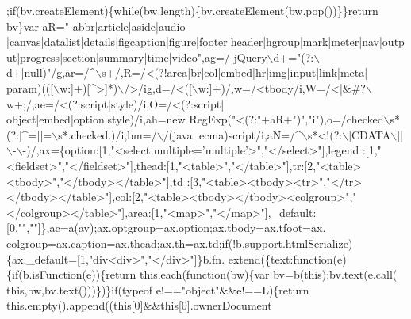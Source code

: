 \begin{DoxyCode}
      ;\textcolor{keywordflow}{if}(bv.createElement)\{\textcolor{keywordflow}{while}(bw.length)\{bv.createElement(bw.pop())\}\}\textcolor{keywordflow}{return} bv\}var aR=\textcolor{stringliteral}{"
      abbr|article|aside|audio
      |canvas|datalist|details|figcaption|figure|footer|header|hgroup|mark|meter|nav|output|progress|section|summary|time|video"},ag=/ jQuery\(\backslash\)d+=\textcolor{stringliteral}{"(?:\(\backslash\)d+|null)"}/g,ar=/^\(\backslash\)s+/,R=/<(?!area|br|col|embed|hr|img|input|link|meta|
      param)(([\(\backslash\)w:]+)[^>]*)\(\backslash\)/>/ig,d=/<([\(\backslash\)w:]+)/,w=/<tbody/i,W=/<|&#?\(\backslash\)w+;/,ae=/<(?:script|style)/i,O=/<(?:script|\textcolor{keywordtype}{
      object}|embed|option|style)/i,ah=\textcolor{keyword}{new} RegExp(\textcolor{stringliteral}{"<(?:"}+aR+\textcolor{stringliteral}{")"},\textcolor{stringliteral}{"i"}),o=/checked\(\backslash\)s*(?:[^=]|=\(\backslash\)s*.checked.)/i,bm=/\(\backslash\)/(java|
      ecma)script/i,aN=/^\(\backslash\)s*<!(?:\(\backslash\)[CDATA\(\backslash\)[|\(\backslash\)-\(\backslash\)-)/,ax=\{option:[1,\textcolor{stringliteral}{"<select multiple='multiple'>"},\textcolor{stringliteral}{"</select>"}],legend
      :[1,\textcolor{stringliteral}{"<fieldset>"},\textcolor{stringliteral}{"</fieldset>"}],thead:[1,\textcolor{stringliteral}{"<table>"},\textcolor{stringliteral}{"</table>"}],tr:[2,\textcolor{stringliteral}{"<table><tbody>"},\textcolor{stringliteral}{"</tbody></table>"}],td
      :[3,\textcolor{stringliteral}{"<table><tbody><tr>"},\textcolor{stringliteral}{"</tr></tbody></table>"}],col:[2,\textcolor{stringliteral}{"<table><tbody></tbody><colgroup>"},\textcolor{stringliteral}{"
      </colgroup></table>"}],area:[1,\textcolor{stringliteral}{"<map>"},\textcolor{stringliteral}{"</map>"}],\_default:[0,\textcolor{stringliteral}{""},\textcolor{stringliteral}{""}]\},ac=a(av);ax.optgroup=ax.option;ax.tbody=ax.tfoot=ax.
      colgroup=ax.caption=ax.thead;ax.th=ax.td;\textcolor{keywordflow}{if}(!b.support.htmlSerialize)\{ax.\_default=[1,\textcolor{stringliteral}{"div<div>"},\textcolor{stringliteral}{"</div>"}]\}b.fn.
      extend(\{text:\textcolor{keyword}{function}(e)\{\textcolor{keywordflow}{if}(b.isFunction(e))\{\textcolor{keywordflow}{return} this.each(\textcolor{keyword}{function}(bw)\{var bv=b(\textcolor{keyword}{this});bv.text(e.call(\textcolor{keyword}{
      this},bw,bv.text()))\})\}\textcolor{keywordflow}{if}(typeof e!==\textcolor{stringliteral}{"object"}&&e!==L)\{\textcolor{keywordflow}{return} this.empty().append((\textcolor{keyword}{this}[0]&&\textcolor{keyword}{this}[0].ownerDocument

\end{DoxyCode}
